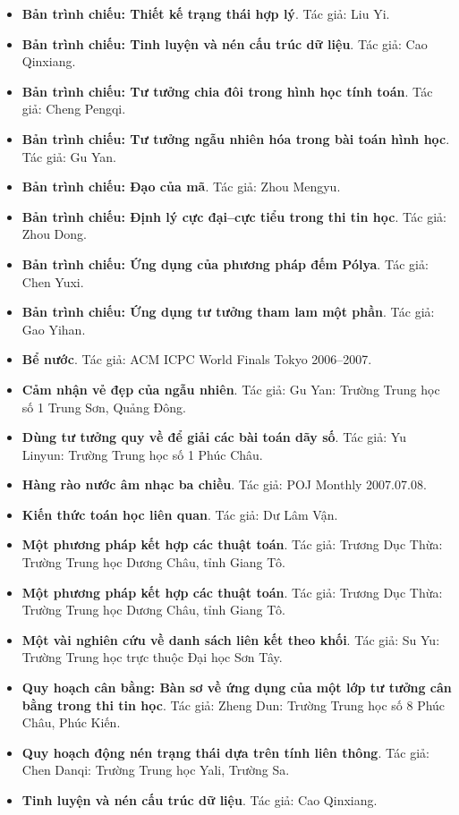 \documentclass[11pt]{article}
\begin{document}
\begin{itemize}[leftmargin=2em]
  \item \textbf{Bản trình chiếu: Thiết kế trạng thái hợp lý}. Tác giả: Liu Yi.
  \item \textbf{Bản trình chiếu: Tinh luyện và nén cấu trúc dữ liệu}. Tác giả: Cao Qinxiang.
  \item \textbf{Bản trình chiếu: Tư tưởng chia đôi trong hình học tính toán}. Tác giả: Cheng Pengqi.
  \item \textbf{Bản trình chiếu: Tư tưởng ngẫu nhiên hóa trong bài toán hình học}. Tác giả: Gu Yan.
  \item \textbf{Bản trình chiếu: Đạo của mã}. Tác giả: Zhou Mengyu.
  \item \textbf{Bản trình chiếu: Định lý cực đại--cực tiểu trong thi tin học}. Tác giả: Zhou Dong.
  \item \textbf{Bản trình chiếu: Ứng dụng của phương pháp đếm Pólya}. Tác giả: Chen Yuxi.
  \item \textbf{Bản trình chiếu: Ứng dụng tư tưởng tham lam một phần}. Tác giả: Gao Yihan.
  \item \textbf{Bể nước}. Tác giả: ACM ICPC World Finals Tokyo 2006--2007.
  \item \textbf{Cảm nhận vẻ đẹp của ngẫu nhiên}. Tác giả: Gu Yan: Trường Trung học số 1 Trung Sơn, Quảng Đông.
  \item \textbf{Dùng tư tưởng quy về để giải các bài toán dãy số}. Tác giả: Yu Linyun: Trường Trung học số 1 Phúc Châu.
  \item \textbf{Hàng rào nước âm nhạc ba chiều}. Tác giả: POJ Monthly 2007.07.08.
  \item \textbf{Kiến thức toán học liên quan}. Tác giả: Dư Lâm Vận.
  \item \textbf{Một phương pháp kết hợp các thuật toán}. Tác giả: Trương Dục Thừa: Trường Trung học Dương Châu, tỉnh Giang Tô.
  \item \textbf{Một phương pháp kết hợp các thuật toán}. Tác giả: Trương Dục Thừa: Trường Trung học Dương Châu, tỉnh Giang Tô.
  \item \textbf{Một vài nghiên cứu về danh sách liên kết theo khối}. Tác giả: Su Yu: Trường Trung học trực thuộc Đại học Sơn Tây.
  \item \textbf{Quy hoạch cân bằng: Bàn sơ về ứng dụng của một lớp tư tưởng cân bằng trong thi tin học}. Tác giả: Zheng Dun: Trường Trung học số 8 Phúc Châu, Phúc Kiến.
  \item \textbf{Quy hoạch động nén trạng thái dựa trên tính liên thông}. Tác giả: Chen Danqi: Trường Trung học Yali, Trường Sa.
  \item \textbf{Tinh luyện và nén cấu trúc dữ liệu}. Tác giả: Cao Qinxiang.

\end{itemize}
\end{document}
